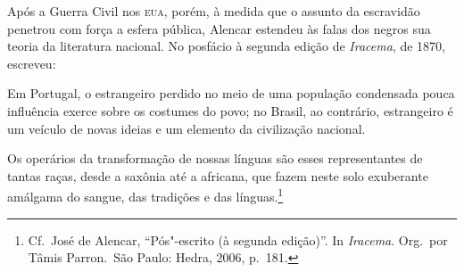 Após a Guerra Civil nos \textsc{eua}, porém, à  medida que o assunto da
escravidão penetrou com força a esfera pública, Alencar estendeu às
falas dos negros sua teoria da literatura nacional. No posfácio à 
segunda edição de \textit{Iracema}, de 1870, escreveu: 

\begin{hedraquote}
Em Portugal, o estrangeiro perdido no meio de uma população condensada
pouca influência exerce sobre os costumes do povo; no Brasil, ao
contrário, estrangeiro é um veículo de novas ideias e um elemento da
civilização nacional.

Os operários da transformação de nossas línguas são esses representantes
de tantas raças, desde a saxônia até a africana, que fazem neste solo
exuberante amálgama do sangue, das tradições e das línguas.\footnote{ Cf.~José de Alencar, 
``Pós"-escrito (à  segunda edição)''. In
\textit{Iracema}. Org.~por Tâmis Parron.~São Paulo: Hedra, 2006, p.~181.} 
\end{hedraquote}

